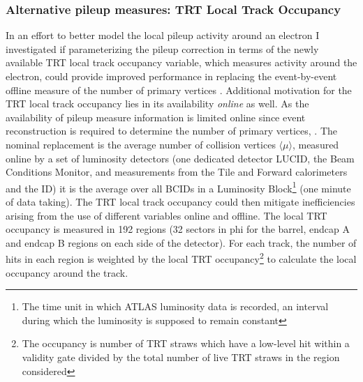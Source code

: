 \subsubsection{Alternative pileup measures: TRT Local Track Occupancy}\label{sec:egamma:TRTTrackOcc}
In an effort to better model the local pileup activity around an electron I investigated if parameterizing the pileup correction in terms of the newly available TRT local track occupancy variable, which measures activity around the electron, could provide improved performance in replacing the event-by-event offline measure of the number of primary vertices \nvtx.
Additional motivation for the TRT local track occupancy lies in its availability \emph{online} as well.
As the availability of pileup measure information is limited online since event reconstruction is required to determine the number of primary vertices, \nvtx.
The nominal replacement is the average number of collision vertices $\langle \mu \rangle$, measured online by a set of luminosity detectors (one dedicated detector LUCID, the Beam Conditions Monitor, and measurements from the Tile and Forward calorimeters and the ID) it is the average over all BCIDs in a Luminosity Block\footnote{The time unit in which ATLAS luminosity data is recorded, an interval during which the luminosity is supposed to remain constant} (one minute of data taking). The TRT local track occupancy could then mitigate inefficiencies arising from the use of different variables online and offline.
The local TRT occupancy is measured in 192 regions (32 sectors in phi for the barrel, endcap A and endcap B regions on each side of the detector).
For each track, the number of hits in each region is weighted by the local TRT occupancy\footnote{The occupancy is number of TRT straws which have a low-level hit within a validity gate divided by the total number of live TRT straws in the region considered} to calculate the local occupancy around the track.  
